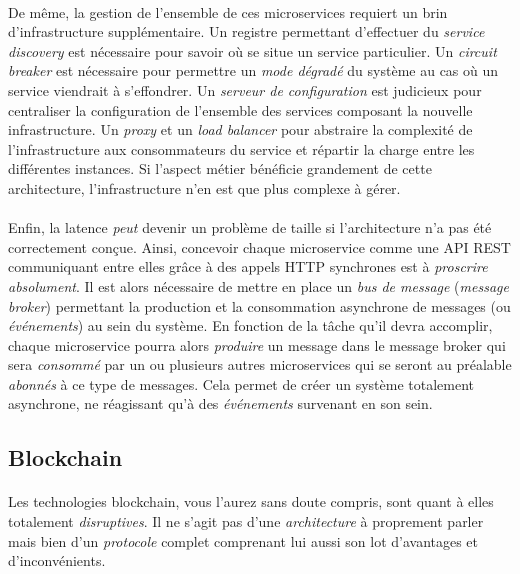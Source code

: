 \paragraph{} De même, la gestion de l'ensemble de ces microservices requiert un brin d'infrastructure supplémentaire.
Un registre permettant d'effectuer du \emph{service discovery} est nécessaire pour savoir où se situe un service particulier.
Un \emph{circuit breaker} est nécessaire pour permettre un \emph{mode dégradé} du système au cas où un service viendrait
à s'effondrer. Un \emph{serveur de configuration} est judicieux pour centraliser la configuration de l'ensemble des services
composant la nouvelle infrastructure. Un \emph{proxy} et un \emph{load balancer} pour abstraire la complexité de l'infrastructure
aux consommateurs du service et répartir la charge entre les différentes instances. Si l'aspect métier bénéficie grandement
de cette architecture, l'infrastructure n'en est que plus complexe à gérer.

\paragraph{} Enfin, la latence \emph{peut} devenir un problème de taille si l'architecture n'a pas été correctement conçue.
Ainsi, concevoir chaque microservice comme une API REST communiquant entre elles grâce à des appels HTTP synchrones est à
\emph{proscrire absolument}. Il est alors nécessaire de mettre en place un \emph{bus de message} (\emph{message broker})
permettant la production et la consommation asynchrone de messages (ou \emph{événements}) au sein du système. En fonction
de la tâche qu'il devra accomplir, chaque microservice pourra alors \emph{produire} un message dans le message broker qui
sera \emph{consommé} par un ou plusieurs autres microservices qui se seront au préalable \emph{abonnés} à ce type de messages.
Cela permet de créer un système totalement asynchrone, ne réagissant qu'à des \emph{événements} survenant en son sein.


\subsection*{Blockchain}

\paragraph{} Les technologies blockchain, vous l'aurez sans doute compris, sont quant à elles totalement \emph{disruptives}.
Il ne s'agit pas d'une \emph{architecture} à proprement parler mais bien d'un \emph{protocole} complet comprenant lui aussi
son lot d'avantages et d'inconvénients.

